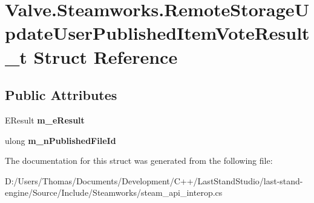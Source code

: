 \hypertarget{structValve_1_1Steamworks_1_1RemoteStorageUpdateUserPublishedItemVoteResult__t}{}\section{Valve.\+Steamworks.\+Remote\+Storage\+Update\+User\+Published\+Item\+Vote\+Result\+\_\+t Struct Reference}
\label{structValve_1_1Steamworks_1_1RemoteStorageUpdateUserPublishedItemVoteResult__t}
\subsection*{Public Attributes}
\begin{DoxyCompactItemize}
\item 
\hypertarget{structValve_1_1Steamworks_1_1RemoteStorageUpdateUserPublishedItemVoteResult__t_aedf491f28818d744865255871bf73719}{}E\+Result {\bfseries m\+\_\+e\+Result}\label{structValve_1_1Steamworks_1_1RemoteStorageUpdateUserPublishedItemVoteResult__t_aedf491f28818d744865255871bf73719}

\item 
\hypertarget{structValve_1_1Steamworks_1_1RemoteStorageUpdateUserPublishedItemVoteResult__t_afb3162f048b770f90bece258937634bf}{}ulong {\bfseries m\+\_\+n\+Published\+File\+Id}\label{structValve_1_1Steamworks_1_1RemoteStorageUpdateUserPublishedItemVoteResult__t_afb3162f048b770f90bece258937634bf}

\end{DoxyCompactItemize}


The documentation for this struct was generated from the following file\+:\begin{DoxyCompactItemize}
\item 
D\+:/\+Users/\+Thomas/\+Documents/\+Development/\+C++/\+Last\+Stand\+Studio/last-\/stand-\/engine/\+Source/\+Include/\+Steamworks/steam\+\_\+api\+\_\+interop.\+cs\end{DoxyCompactItemize}
